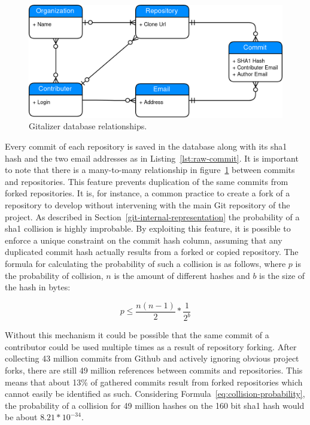 \begin{figure}[H]
\includegraphics[scale=0.3]{./graphs/gitalizer-data-structure}
\centering
\caption{Gitalizer database relationships.}\label{fig:gitalizer-relationship}
\end{figure}

Every commit of each repository is saved in the database along with its \ac{sha1} hash and the two email addresses as in Listing~\ref{lst:raw-commit}.
It is important to note that there is a many-to-many relationship in figure~\ref{fig:gitalizer-relationship} between commits and repositories.
This feature prevents duplication of the same commits from forked repositories.
It is, for instance, a common practice to create a fork of a repository to develop without intervening with the main Git repository of the project.
As described in Section~\ref{git-internal-representation} the probability of a \ac{sha1} collision is highly improbable.
By exploiting this feature, it is possible to enforce a unique constraint on the commit hash column, assuming that any duplicated commit hash actually results from a forked or copied repository.
The formula for calculating the probability of such a collision is as follows, where $p$ is the probability of collision, $n$ is the amount of different hashes and $b$ is the size of the hash in bytes:

\begin{equation}\label{eq:collision-probability}
    p \leq \frac{n(n-1)}{2} * \frac{1}{2^{b}}
\end{equation}

Without this mechanism it could be possible that the same commit of a contributor could be used multiple times as a result of repository forking.
After collecting 43 million commits from Github and actively ignoring obvious project forks, there are still 49 million references between commits and repositories.
This means that about 13\% of gathered commits result from forked repositories which cannot easily be identified as such.
Considering Formula~\ref{eq:collision-probability}, the probability of a collision for 49 million hashes on the 160 bit \ac{sha1} hash would be about $8.21 * 10^{-34}$.

